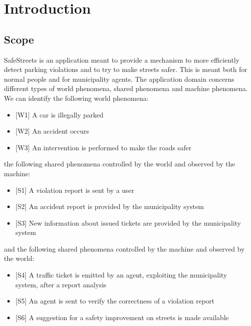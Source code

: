\documentclass[a4paper]{report}
\begin{document}
\tableofcontents
\listoffigures
\begingroup
\let\clearpage\relax %
\listoftables
\endgroup
\restoregeometry
\chapter{Introduction}
\section{Scope}
SafeStreets is an application meant to provide a mechanism to more efficiently detect parking violations and to try to make streets safer. This is meant both for normal people and for municipality agents. 
The application domain concerns different types of world phenomena, shared phenomena and machine phenomena. \\
We can identify the following world phenomena:
\begin{itemize}
\item {[W1]} \label{W1}A car is illegally parked 
\item {[W2]} \label{W2}An accident occurs
\item {[W3]} \label{W3}An intervention is performed to make the roads safer
\end{itemize} 
the following shared phenomena controlled by the world and observed by the machine:
\begin{itemize}
\item {[S1]} A violation report is sent by a user
\item {[S2]} An accident report is provided by the municipality system
\item {[S3]} New information about issued tickets are provided by the municipality system
\end{itemize}
and the following shared phenomena controlled by the machine and observed by the world:
\begin{itemize}
\item {[S4]} A traffic ticket is emitted by an agent, exploiting the municipality system, after a report analysis
\item {[S5]} An agent is sent to verify the correctness of a violation report
\item {[S6]} A suggestion for a safety improvement on streets is made available
\end{itemize}
\end{document}
